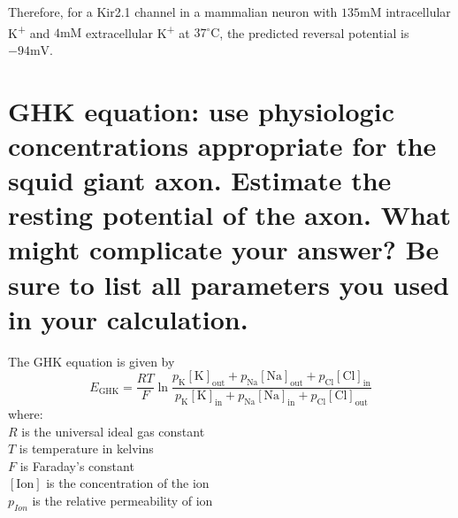 \documentclass{article}
\begin{document}
Therefore, for a Kir2.1 channel in a mammalian neuron with $135\text{mM}$ intracellular K\textsuperscript{+} and $4\text{mM}$ extracellular K\textsuperscript{+} at $37^{\circ}\text{C}$, the predicted reversal potential is $\boxed{-94\text{mV}}$.

\section{GHK equation: use physiologic concentrations appropriate for the squid giant axon. Estimate the resting potential of the axon. What might complicate your answer? Be sure to list all parameters you used in your calculation.}
The GHK equation is given by
$$E_\text{GHK} = \frac{RT}{F}\ln\frac{p_{\text{K}}[\text{K}]_{\text{out}}+p_{\text{Na}}[\text{Na}]_{\text{out}}+p_{\text{Cl}}[\text{Cl}]_{\text{in}}}{p_{\text{K}}[\text{K}]_{\text{in}}+p_{\text{Na}}[\text{Na}]_{\text{in}}+p_{\text{Cl}}[\text{Cl}]_{\text{out}}}$$
where: \\
$R$ is the universal ideal gas constant \\
$T$ is temperature in kelvins \\
$F$ is Faraday's constant \\
$[\text{Ion}]$ is the concentration of the ion \\
$p_{Ion}$ is the relative permeability of ion
\\
\end{document}
